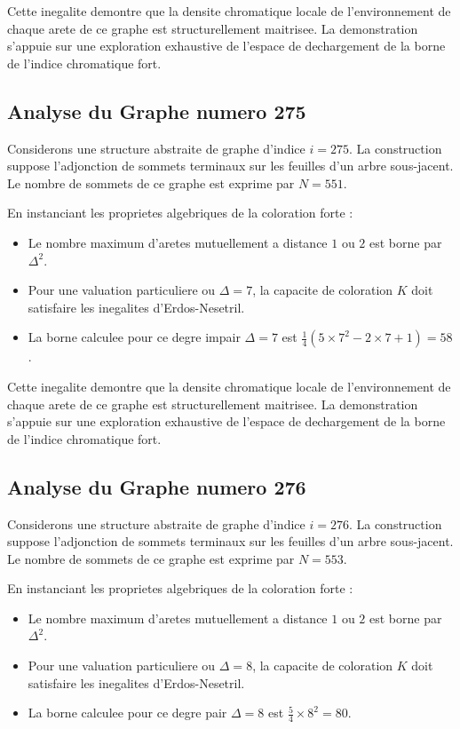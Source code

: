 \documentclass[11pt,a4paper]{article}
\begin{document}
Cette inegalite demontre que la densite chromatique locale de l'environnement de chaque arete de ce graphe est structurellement maitrisee. La demonstration s'appuie sur une exploration exhaustive de l'espace de dechargement de la borne de l'indice chromatique fort.

\subsection{Analyse du Graphe numero 275}
Considerons une structure abstraite de graphe d'indice $i = 275$. La construction suppose l'adjonction de sommets terminaux sur les feuilles d'un arbre sous-jacent. Le nombre de sommets de ce graphe est exprime par $N = 551$.

En instanciant les proprietes algebriques de la coloration forte :
\begin{itemize}
\item Le nombre maximum d'aretes mutuellement a distance $1$ ou $2$ est borne par $\Delta^2$.
\item Pour une valuation particuliere ou $\Delta = 7$, la capacite de coloration $K$ doit satisfaire les inegalites d'Erdos-Nesetril.
\item La borne calculee pour ce degre impair $\Delta = 7$ est $\frac{1}{4}(5 \times 7^2 - 2 \times 7 + 1) = 58$.
\end{itemize}

Cette inegalite demontre que la densite chromatique locale de l'environnement de chaque arete de ce graphe est structurellement maitrisee. La demonstration s'appuie sur une exploration exhaustive de l'espace de dechargement de la borne de l'indice chromatique fort.

\subsection{Analyse du Graphe numero 276}
Considerons une structure abstraite de graphe d'indice $i = 276$. La construction suppose l'adjonction de sommets terminaux sur les feuilles d'un arbre sous-jacent. Le nombre de sommets de ce graphe est exprime par $N = 553$.

En instanciant les proprietes algebriques de la coloration forte :
\begin{itemize}
\item Le nombre maximum d'aretes mutuellement a distance $1$ ou $2$ est borne par $\Delta^2$.
\item Pour une valuation particuliere ou $\Delta = 8$, la capacite de coloration $K$ doit satisfaire les inegalites d'Erdos-Nesetril.
\item La borne calculee pour ce degre pair $\Delta = 8$ est $\frac{5}{4} \times 8^2 = 80$.
\end{itemize}
\end{document}
